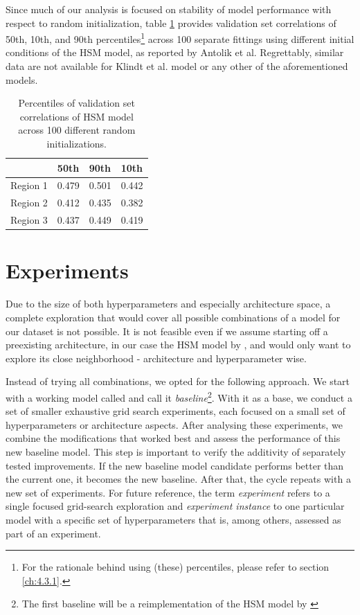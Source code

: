 Since much of our analysis is focused on stability of model performance with respect to random initialization, table \ref{tab:4.3} provides validation set correlations of 50th, 10th, and 90th percentiles\footnote{For the rationale behind using (these) percentiles, please refer to section \ref{ch:4.3.1}.} across 100 separate fittings using different initial conditions of the HSM model, as reported by Antolik et al. Regrettably, similar data are not available for Klindt et al. model or any other of the aforementioned models.

\begin{table}[ht]
    \renewcommand{\arraystretch}{1.0}
    \centering
    \begin{tabular}{l|l|l|l}
        \toprule
        & \textbf{50th} & \textbf{90th} & \textbf{10th} \\ \midrule
        Region 1 & 0.479 & 0.501 & 0.442 \\ 
        Region 2 & 0.412 & 0.435 & 0.382 \\ 
        Region 3 & 0.437 & 0.449 & 0.419 \\ \bottomrule

    \end{tabular}
    \caption[Performance percentiles of HSM model]{Percentiles of validation set correlations of HSM model across 100 different random initializations.}
    \label{tab:4.3}
    \renewcommand{\arraystretch}{1.0}
\end{table}

\section{Experiments}\label{ch:4.2.1}

Due to the size of both hyperparameters and especially architecture space, a complete exploration that would cover all possible combinations of a model for our dataset is not possible. It is not feasible even if we assume starting off a preexisting architecture, in our case the HSM model by \cite{antolik}, and would only want to explore its close neighborhood - architecture and hyperparameter wise. 

Instead of trying all combinations, we opted for the following approach. We start with a working model called and call it \textit{baseline}\footnote{The first baseline will be a reimplementation of the HSM model by \cite{antolik}}. With it as a base, we conduct a set of smaller exhaustive grid search experiments, each focused on a small set of hyperparameters or architecture aspects. After analysing these experiments, we combine the modifications that worked best and assess the performance of this new baseline model. This step is important to verify the additivity of separately tested improvements. If the new baseline model candidate performs better than the current one, it becomes the new baseline. After that, the cycle repeats with a new set of experiments. For future reference, the term \textit{experiment} refers to a single focused grid-search exploration and \textit{experiment instance} to one particular model with a specific set of hyperparameters that is, among others, assessed as part of an experiment.

